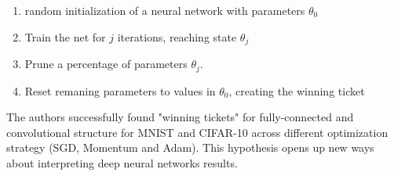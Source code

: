 \documentclass[11pt,a4paper]{article}
\begin{document}
\begin{enumerate}
 \item random initialization of a neural network with parameters $\theta_0$
 \item Train the net for $j$ iterations, reaching state $\theta_j$
 \item Prune a percentage of parameters $\theta_j$.
 \item Reset remaning parameters to values in $\theta_0$, creating the winning ticket
\end{enumerate}

The authors successfully found "winning tickets" for fully-connected and convolutional structure for MNIST and CIFAR-10 across different optimization strategy (SGD, Momentum and Adam). This hypothesis opens up new ways about interpreting deep neural networks results.



\newpage
\nocite{*}


\end{document}
